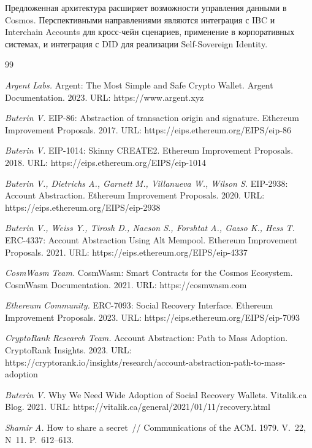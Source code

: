 Предложенная архитектура расширяет возможности управления данными в Cosmos. Перспективными направлениями являются интеграция с IBC и Interchain Accounts для кросс-чейн сценариев, применение в корпоративных системах, и интеграция с DID для реализации Self-Sovereign Identity.

\themeline

\renewcommand\bibname{Список литературы}
\begin{thebibliography}{99}

 \textit{Argent Labs.} Argent: The Most Simple and Safe Crypto Wallet. Argent Documentation. 2023. URL: https://www.argent.xyz

 \textit{Buterin V.} EIP-86: Abstraction of transaction origin and signature. Ethereum Improvement Proposals. 2017. URL: https://eips.ethereum.org/EIPS/eip-86

 \textit{Buterin V.} EIP-1014: Skinny CREATE2. Ethereum Improvement Proposals. 2018. URL: https://eips.ethereum.org/EIPS/eip-1014

 \textit{Buterin V., Dietrichs A., Garnett M., Villanueva W., Wilson S.} EIP-2938: Account Abstraction. Ethereum Improvement Proposals. 2020. URL: https://eips.ethereum.org/EIPS/eip-2938

 \textit{Buterin V., Weiss Y., Tirosh D., Nacson S., Forshtat A., Gazso K., Hess T.} ERC-4337: Account Abstraction Using Alt Mempool. Ethereum Improvement Proposals. 2021. URL: https://eips.ethereum.org/EIPS/eip-4337

 \textit{CosmWasm Team.} CosmWasm: Smart Contracts for the Cosmos Ecosystem. CosmWasm Documentation. 2021. URL: https://cosmwasm.com

 \textit{Ethereum Community.} ERC-7093: Social Recovery Interface. Ethereum Improvement Proposals. 2023. URL: https://eips.ethereum.org/EIPS/eip-7093

 \textit{CryptoRank Research Team.} Account Abstraction: Path to Mass Adoption. CryptoRank Insights. 2023. URL: https://cryptorank.io/insights/research/account-abstraction-path-to-mass-adoption

 \textit{Buterin V.} Why We Need Wide Adoption of Social Recovery Wallets. Vitalik.ca Blog. 2021. URL: https://vitalik.ca/general/2021/01/11/recovery.html

 \textit{Shamir A.} How to share a secret~// Communications of the ACM. 1979. V.~22, N~11. P.~612--613.


\end{thebibliography}
